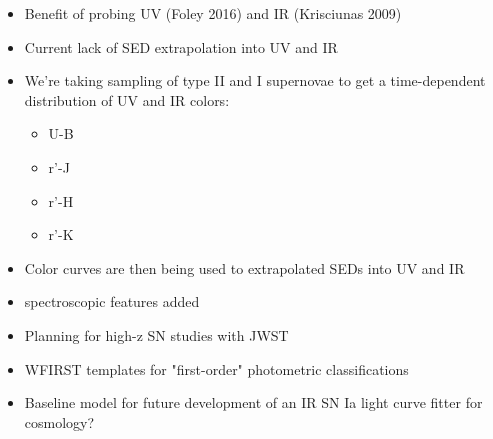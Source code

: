 \begin{itemize}
\item
Benefit of probing UV (Foley 2016) and IR (Krisciunas 2009)
\item
Current lack of SED extrapolation into UV and IR
\item
We're taking sampling of type II and I supernovae to get a time-dependent distribution of UV and IR colors:
\begin{itemize}
\item
U-B
\item
r'-J
\item
r'-H
\item
r'-K
\end{itemize}
\item
Color curves are then being used to extrapolated SEDs into UV and IR
\item
spectroscopic features added
\item
Planning for high-z SN studies with JWST
\item
WFIRST templates for "first-order" photometric classifications
\item
Baseline model for future development of an IR SN Ia light curve fitter for cosmology?
\end{itemize}